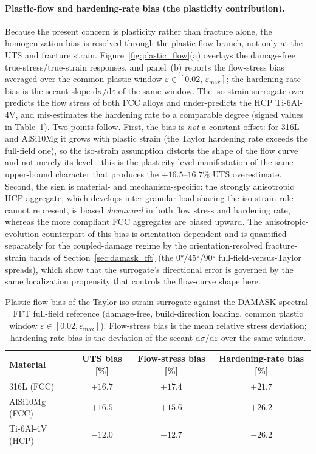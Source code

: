 \documentclass[twocolumn]{sagej}
\begin{document}
\paragraph{Plastic-flow and hardening-rate bias (the plasticity contribution).}
Because the present concern is plasticity rather than fracture alone, the homogenization bias is resolved through the plastic-flow branch, not only at the UTS and fracture strain. Figure~\ref{fig:plastic_flow}(a) overlays the damage-free true-stress/true-strain responses, and panel~(b) reports the flow-stress bias averaged over the common plastic window $\varepsilon\in[0.02,\,\varepsilon_{\max}]$; the hardening-rate bias is the secant slope $\mathrm{d}\sigma/\mathrm{d}\varepsilon$ of the same window. The iso-strain surrogate over-predicts the flow stress of both FCC alloys and under-predicts the HCP Ti-6Al-4V, and mis-estimates the hardening rate to a comparable degree (signed values in Table~\ref{tab:plastic_flow_bias}). Two points follow. First, the bias is \emph{not} a constant offset: for 316L and AlSi10Mg it grows with plastic strain (the Taylor hardening rate exceeds the full-field one), so the iso-strain assumption distorts the shape of the flow curve and not merely its level---this is the plasticity-level manifestation of the same upper-bound character that produces the $+16.5$--$16.7\%$ UTS overestimate. Second, the sign is material- and mechanism-specific: the strongly anisotropic HCP aggregate, which develops inter-granular load sharing the iso-strain rule cannot represent, is biased \emph{downward} in both flow stress and hardening rate, whereas the more compliant FCC aggregates are biased upward. The anisotropic-evolution counterpart of this bias is orientation-dependent and is quantified separately for the coupled-damage regime by the orientation-resolved fracture-strain bands of Section~\ref{sec:damask_fft} (the $\ang{0}$/$\ang{45}$/$\ang{90}$ full-field-versus-Taylor spreads), which show that the surrogate's directional error is governed by the same localization propensity that controls the flow-curve shape here.

\begin{table}[htbp]
\centering
\caption{Plastic-flow bias of the Taylor iso-strain surrogate against the DAMASK spectral-FFT full-field reference (damage-free, build-direction loading, common plastic window $\varepsilon\in[0.02,\varepsilon_{\max}]$). Flow-stress bias is the mean relative stress deviation; hardening-rate bias is the deviation of the secant $\mathrm{d}\sigma/\mathrm{d}\varepsilon$ over the same window.}
\label{tab:plastic_flow_bias}
\footnotesize
\setlength{\tabcolsep}{4pt}
\begin{tabular}{lccc}
\toprule
\textbf{Material} & \textbf{UTS bias [\%]} & \textbf{Flow-stress bias [\%]} & \textbf{Hardening-rate bias [\%]} \\
\midrule
316L (FCC)      & $+16.7$ & $+17.4$ & $+21.7$ \\
AlSi10Mg (FCC)  & $+16.5$ & $+15.6$ & $+26.2$ \\
Ti-6Al-4V (HCP) & $-12.0$ & $-12.7$ & $-26.2$ \\
\bottomrule
\end{tabular}
\end{table}
\end{document}
